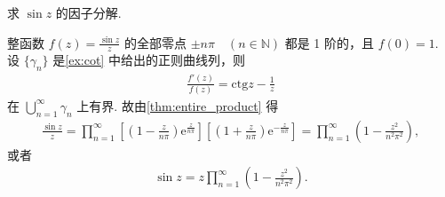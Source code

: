 \documentclass[../../main.tex]{subfiles}%
\begin{document}
\begin{example} \label{ex:sin}
求 \(\sin z\) 的因子分解.
\end{example}
\begin{solution}
整函数 \(f(z) = \frac{\sin z}{z}\) 的全部零点 \(\pm n\pi \quad (n \in \mathbb{N})\) 都是 1 阶的，且 \(f(0) = 1\). 设 \(\{\gamma_n\}\) 是\cref{ex:cot} 中给出的正则曲线列，则
\begin{align*}
\frac{f'(z)}{f(z)} = \text{ctg} z - \frac{1}{z}
\end{align*}
在 \(\bigcup\limits_{n=1}^\infty \gamma_n\) 上有界. 故由\cref{thm:entire_product} 得
\begin{align*}
\frac{\sin z}{z} = \prod_{n=1}^\infty \left[ \left( 1 - \frac{z}{n\pi} \right) \mathrm{e}^{\frac{z}{n\pi}} \right] \left[ \left( 1 + \frac{z}{n\pi} \right) \mathrm{e}^{-\frac{z}{n\pi}} \right] = \prod_{n=1}^\infty \left( 1 - \frac{z^2}{n^2 \pi^2} \right),
\end{align*}
或者
\begin{align*}
\sin z = z \prod_{n=1}^\infty \left( 1 - \frac{z^2}{n^2 \pi^2} \right).
\end{align*}
\end{solution}
\end{document}
